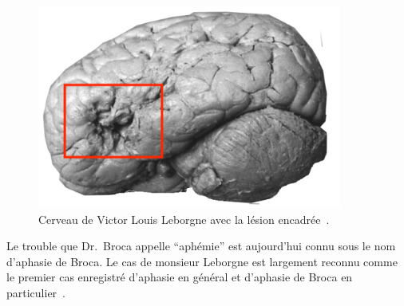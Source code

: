 \begin{figure}[htb]
    \begin{center}
        \includegraphics[width=10cm]{assets/images/leborgne-brain.png}
    \end{center}
    \caption[Cerveau de Victor Louis Leborgne avec la lésion encadrée.]
    {Cerveau de Victor Louis Leborgne avec la lésion encadrée~\cite{Lopes_2019}.}
    \label{fig.leborgne-brain}
\end{figure}

Le trouble que Dr.~Broca appelle ``aphémie'' 
est aujourd'hui connu sous le nom d'aphasie de Broca.
Le cas de monsieur Leborgne est largement reconnu comme le premier cas enregistré d'aphasie en général
et d'aphasie de Broca en particulier~\cite{Mohammed_Narayan_Patra_Nanda_2018}.